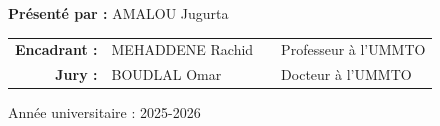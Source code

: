 \documentclass[12pt,a4paper]{article}
\begin{document}
\begin{titlepage}
		{\large \textbf{Présenté par :} AMALOU Jugurta\par}
		\vspace{2cm}
		
		{\large
		\begin{tabular}{r l l l}

			\textbf{Encadrant :} & MEHADDENE Rachid & \hspace{.5cm} & Professeur à l'UMMTO \\[.5cm]
			\textbf{Jury :} & BOUDLAL Omar & \hspace{.5cm} & Docteur à l'UMMTO
		\end{tabular}
		}
		\vfill
		{\large Année universitaire : 2025-2026\par}
		
	\end{titlepage}
	
	
	
	
	
	
	
	
	
	
	
	
	
	
	
	
	
	
	
	
	
	
	














	
	
	
\end{document}
